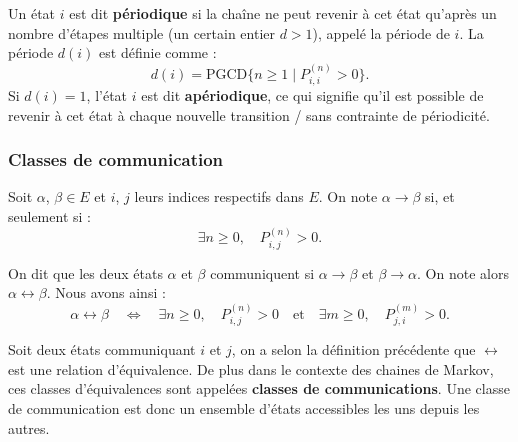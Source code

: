 \documentclass{article}
\begin{document}
\begin{tcolorbox}[colback=white,colframe=blue!80!black,title=État périodique]
Un état $i$ est dit \textbf{périodique} si la chaîne ne peut revenir à cet état qu'après un nombre d'étapes multiple (un certain entier $d > 1$), appelé la période de $i$. La période $d(i)$ est définie comme :
\[
d(i) = \text{PGCD}\{n \geq 1 \mid P_{i,i}^{(n)} > 0\}.
\]
Si $d(i) = 1$, l'état $i$ est dit \textbf{apériodique}, ce qui signifie qu'il est possible de revenir à cet état à chaque nouvelle transition /  sans contrainte de périodicité. \\
\end{tcolorbox}


\subsubsection{Classes de communication}

\begin{tcolorbox}[colback=white,colframe=yellow!80!black,title=Backup à modifier/supprimer]
Soit $\alpha$, $\beta \in E$ et $i$, $j$ leurs indices respectifs dans $E$. On note $\alpha \rightarrow \beta$ si, et seulement si :
\[
\exists n \geq 0, \quad P_{i,j}^{(n)} > 0.
\]

On dit que les deux états $\alpha$ et $\beta$ communiquent si $\alpha \rightarrow \beta$ et $\beta \rightarrow \alpha$. On note alors $\alpha \leftrightarrow \beta$. Nous avons ainsi :
\[
\alpha \leftrightarrow \beta \quad \iff \quad \exists n \geq 0, \quad P_{i,j}^{(n)} > 0 \quad \text{et} \quad \exists m \geq 0, \quad P_{j,i}^{(m)} > 0.
\]
\end{tcolorbox}

\begin{tcolorbox}[colback=white,colframe=red!80!black,title=Classe de communication]
Soit deux états communiquant $i$ et $j$, on a selon la définition précédente que $\leftrightarrow$ est une relation d'équivalence. De plus dans le contexte des chaines de Markov, ces classes d'équivalences sont appelées \textbf{classes de communications}.
Une classe de communication est donc un ensemble d'états accessibles les uns depuis les autres. \\
\end{tcolorbox}
\end{document}
